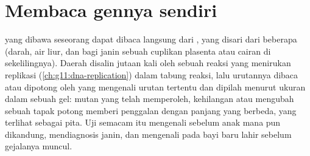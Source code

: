 \section{Membaca gennya sendiri}

\begin{proposition}\label{prop:g11:genes-and-disease:testing}
 yang dibawa seseorang dapat dibaca langsung dari , yang
disari dari beberapa  (darah, air liur, dan bagi janin sebuah
cuplikan plasenta atau cairan di sekelilingnya). Daerah  disalin
jutaan kali oleh sebuah reaksi yang menirukan replikasi
(\cref{ch:g11:dna-replication}) dalam tabung reaksi, lalu urutannya
dibaca atau dipotong oleh  yang mengenali urutan tertentu dan
dipilah menurut ukuran dalam sebuah gel:  mutan yang telah
memperoleh, kehilangan atau mengubah sebuah tapak potong memberi
penggalan dengan panjang yang berbeda, yang terlihat sebagai pita. Uji
semacam itu mengenali  sebelum anak mana pun dikandung,
mendiagnosis janin, dan mengenali  pada bayi baru lahir sebelum
gejalanya muncul.
\end{proposition}
\admitted

